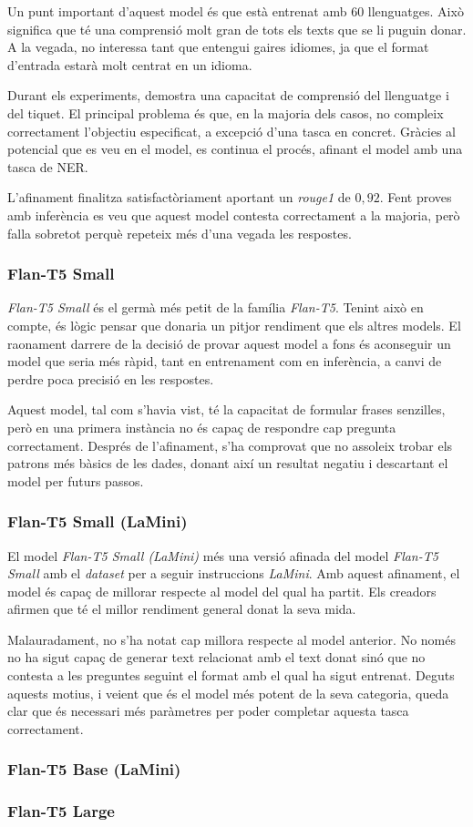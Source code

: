 Un punt important d'aquest model és que està entrenat amb 60 llenguatges. Això significa que té una comprensió molt gran de tots els texts que se li puguin donar. A la vegada, no interessa tant que entengui gaires idiomes, ja que el format d'entrada estarà molt centrat en un idioma.

Durant els experiments, demostra una capacitat de comprensió del llenguatge i del tiquet. El principal problema és que, en la majoria dels casos, no compleix correctament l'objectiu especificat, a excepció d'una tasca en concret. Gràcies al potencial que es veu en el model, es continua el procés, afinant el model amb una tasca de NER.

L'afinament finalitza satisfactòriament aportant un \textit{rouge1} de $0,92$. Fent proves amb inferència es veu que aquest model contesta correctament a la majoria, però falla sobretot perquè repeteix més d'una vegada les respostes.

\subsubsection{Flan-T5 Small}
\textit{Flan-T5 Small} és el germà més petit de la família \textit{Flan-T5}. Tenint això en compte, és lògic pensar que donaria un pitjor rendiment que els altres models. El raonament darrere de la decisió de provar aquest model a fons és aconseguir un model que seria més ràpid, tant en entrenament com en inferència, a canvi de perdre poca precisió en les respostes.

Aquest model, tal com s'havia vist, té la capacitat de formular frases senzilles, però en una primera instància no és capaç de respondre cap pregunta correctament. Després de l'afinament, s'ha comprovat que no assoleix trobar els patrons més bàsics de les dades, donant així un resultat negatiu i descartant el model per futurs passos.

\subsubsection{Flan-T5 Small (LaMini)}
El model \textit{Flan-T5 Small (LaMini)} més una versió afinada del model \textit{Flan-T5 Small} amb el \textit{dataset} per a seguir instruccions \textit{LaMini}. Amb aquest afinament, el model és capaç de millorar respecte al model del qual ha partit. Els creadors afirmen que té el millor rendiment general donat la seva mida.

Malauradament, no s'ha notat cap millora respecte al model anterior. No només no ha sigut capaç de generar text relacionat amb el text donat sinó que no contesta a les preguntes seguint el format amb el qual ha sigut entrenat. Deguts aquests motius, i veient que és el model més potent de la seva categoria, queda clar que és necessari més paràmetres per poder completar aquesta tasca correctament.

\subsubsection{Flan-T5 Base (LaMini)}
\subsubsection{Flan-T5 Large}

